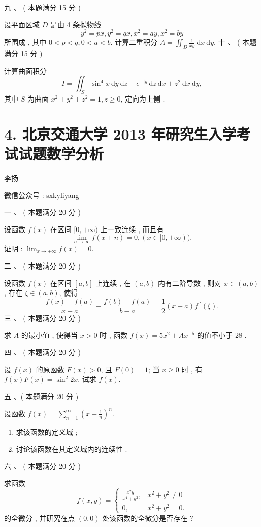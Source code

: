 \documentclass[10pt]{article}
\begin{document}
{ 九 、 ( 本题满分  15  分 )

 设平面区域  $D$  是由  4  条抛物线 
$$
y^{2}=p x, y^{2}=q x, x^{2}=a y, x^{2}=b y
$$
 所围成 ,  其中  $0<p<q, 0<a<b$.  计算二重积分  $A=\iint_{D} \frac{1}{x y} \mathrm{~d} x \mathrm{~d} y$.  十 、 ( 本题满分  15  分 )

 计算曲面积分 
$$
I=\iint_{S} \sin ^{4} x \mathrm{~d} y \mathrm{~d} z+e^{-|y|} \mathrm{d} z \mathrm{~d} x+z^{2} \mathrm{~d} x \mathrm{~d} y,
$$
 其中  $S$  为曲面  $x^{2}+y^{2}+z^{2}=1, z \geqslant 0$,  定向为上侧 .

\section{4. 北京交通大学 2013 年研究生入学考试试题数学分析}
 李扬 

 微信公众号 : sxkyliyang

 一 、 ( 本题满分  20  分 )

 设函数  $f(x)$  在区间  $[0,+\infty)$  上一致连续 ,  而且有 
$$
\lim _{n \rightarrow \infty} f(x+n)=0,(x \in[0,+\infty)) .
$$
 证明 : $\lim _{x \rightarrow+\infty} f(x)=0$.

 二 、 ( 本题满分  20  分 )

 设函数  $f(x)$  在区间  $[a, b]$  上连续 ,  在  $(a, b)$  内有二阶导数 ,  则对  $x \in(a, b)$,  存在  $\xi \in(a, b)$,  使得 
$$
\frac{f(x)-f(a)}{x-a}-\frac{f(b)-f(a)}{b-a}=\frac{1}{2}(x-a) f^{\prime \prime}(\xi) .
$$
 三 、 ( 本题满分  20  分 )

 求  $A$  的最小值 ,  使得当  $x>0$  时 ,  函数  $f(x)=5 x^{2}+A x^{-5}$  的值不小于  28 .

 四 、 ( 本题满分  20  分 )

 设  $f(x)$  的原函数  $F(x)>0$,  且  $F(0)=1$;  当  $x \geqslant 0$  时 ,  有  $f(x) F(x)=\sin ^{2} 2 x$.  试求  $f(x)$.

 五 、( 本题满分  20  分 )

 设函数  $f(x)=\sum_{n=1}^{\infty}\left(x+\frac{1}{n}\right)^{n}$.

\begin{enumerate}
  \item  求该函数的定义域 ;

  \item  讨论该函数在其定义域内的连续性 .

\end{enumerate}
 六 、 ( 本题满分  20  分 )

 求函数 
$$
f(x, y)= \begin{cases}\frac{x^{2} y}{x^{4}+y^{2}}, & x^{2}+y^{2} \neq 0 \\ 0, & x^{2}+y^{2}=0 .\end{cases}
$$
 的全微分 ,  并研究在点  $(0,0)$  处该函数的全微分是否存在 ?

}
\end{document}
